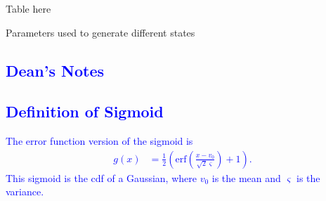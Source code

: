 \documentclass{article}
\newcommand{\brian}[1]{\textcolor{blue}{#1}}
\begin{document}
Table here
\begin{table}
	
	\caption{\label{tbl:Parameters}Parameters used to generate different states}
\end{table}

\brian{\section*{Dean's Notes}
\subsection*{Definition of Sigmoid}
The error function version of the sigmoid is 
\begin{align}
	g(x) &= \frac{1}{2}\left(\mathrm{erf}\left(\frac{x-v_{0}}{\sqrt{2}\varsigma}\right) + 1\right).
\end{align}
This sigmoid is the cdf of a Gaussian, where $v_0$ is the mean and $\varsigma$ is the variance.
}
\end{document}
